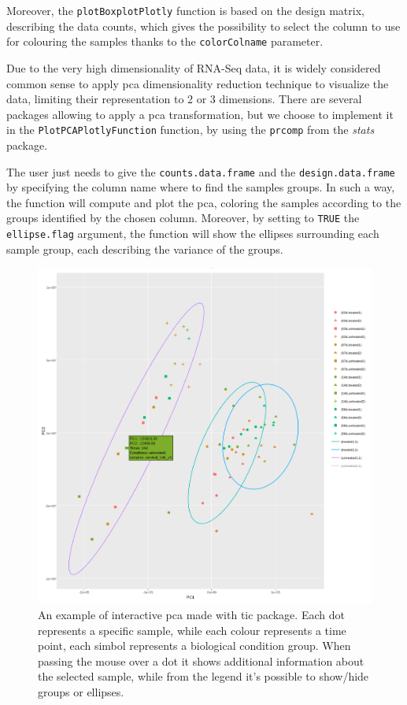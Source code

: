 Moreover, the \lstinline!plotBoxplotPlotly! function is based on the design matrix, describing the data counts, which gives the possibility to select the column to use for colouring the samples thanks to the \lstinline!colorColname! parameter. 

Due to the very high dimensionality of RNA-Seq data, it is widely considered common sense to apply \gls{pca} dimensionality reduction technique to visualize the data, limiting their representation to 2 or 3 dimensions.
There are several packages allowing to apply a \gls{pca} transformation, but we choose to implement it in the \lstinline!PlotPCAPlotlyFunction! function, by using the \lstinline!prcomp! from the \textit{stats} package.

The user just needs to give the \lstinline!counts.data.frame! and the \lstinline!design.data.frame! by specifying the column name where to find the samples groups.
In such a way, the function will compute and plot the \gls{pca}, coloring the samples according to the groups identified by the chosen column.
Moreover, by setting to \lstinline!TRUE! the \lstinline!ellipse.flag! argument, the function will show the ellipses surrounding each sample group, each describing the variance of the groups.

\begin{figure}[H]
\includegraphics[width=\textwidth,height=\textheight,keepaspectratio]{img/ticorser/pca_example.png}
\caption[ticorser pca]{An example of interactive \gls{pca} made with \gls{tic} package. Each dot represents a specific sample, while each colour represents a time point, each simbol represents a biological condition group. When passing the mouse over a dot it shows additional information about the selected sample, while from the legend it's possible to show/hide groups or ellipses.}
\label{fig:ticorserpca}
\centering
\end{figure}

